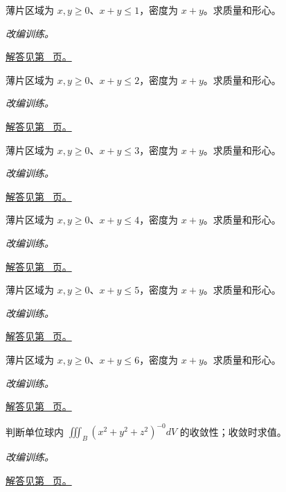 \documentclass[12pt,fontset=fandol]{ctexart}
\begin{document}
\begin{example}[三角形中的非均匀密度]\label{ex:c40q7}
薄片区域为 $x,y\ge0$、$x+y\le 1$，密度为 $x+y$。求质量和形心。
\par\textit{改编训练。}\par\hyperref[ans:c40q7]{解答见第~\pageref{ans:c40q7} 页。}
\end{example}
\begin{example}[三角形中的非均匀密度]\label{ex:c40q8}
薄片区域为 $x,y\ge0$、$x+y\le 2$，密度为 $x+y$。求质量和形心。
\par\textit{改编训练。}\par\hyperref[ans:c40q8]{解答见第~\pageref{ans:c40q8} 页。}
\end{example}
\begin{example}[三角形中的非均匀密度]\label{ex:c40q9}
薄片区域为 $x,y\ge0$、$x+y\le 3$，密度为 $x+y$。求质量和形心。
\par\textit{改编训练。}\par\hyperref[ans:c40q9]{解答见第~\pageref{ans:c40q9} 页。}
\end{example}
\begin{example}[三角形中的非均匀密度]\label{ex:c40q10}
薄片区域为 $x,y\ge0$、$x+y\le 4$，密度为 $x+y$。求质量和形心。
\par\textit{改编训练。}\par\hyperref[ans:c40q10]{解答见第~\pageref{ans:c40q10} 页。}
\end{example}
\begin{example}[三角形中的非均匀密度]\label{ex:c40q11}
薄片区域为 $x,y\ge0$、$x+y\le 5$，密度为 $x+y$。求质量和形心。
\par\textit{改编训练。}\par\hyperref[ans:c40q11]{解答见第~\pageref{ans:c40q11} 页。}
\end{example}
\begin{example}[三角形中的非均匀密度]\label{ex:c40q12}
薄片区域为 $x,y\ge0$、$x+y\le 6$，密度为 $x+y$。求质量和形心。
\par\textit{改编训练。}\par\hyperref[ans:c40q12]{解答见第~\pageref{ans:c40q12} 页。}
\end{example}
\begin{example}[球心奇点的维数阈值]\label{ex:c40q13}
判断单位球内 $\displaystyle\iiint_B(x^2+y^2+z^2)^{-0}dV$ 的收敛性；收敛时求值。
\par\textit{改编训练。}\par\hyperref[ans:c40q13]{解答见第~\pageref{ans:c40q13} 页。}
\end{example}
\end{document}
